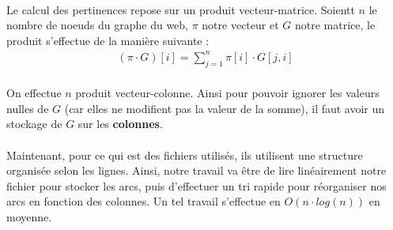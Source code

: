 		\paragraph{}Le calcul des pertinences repose sur un produit vecteur-matrice. Soientt $n$ le nombre de noeuds du graphe du web, $\pi$ notre vecteur et $G$ notre matrice, le produit s'effectue de la manière suivante :
			\begin{align*}
				(\pi \cdot G)[i] = \sum_{j = 1}^{n} \pi[i] \cdot G[j, i]
			\end{align*}
		\paragraph{}On effectue $n$ produit vecteur-colonne. Ainsi pour pouvoir ignorer les valeurs nulles de $G$ (car elles ne modifient pas la valeur de la somme), il faut avoir un stockage de $G$ sur les \textbf{colonnes}.
		\paragraph{}Maintenant, pour ce qui est des fichiers utilisés, ils utilisent une structure organisée selon les lignes. Ainsi, notre travail va être de lire linéairement notre fichier pour stocker les arcs, puis d'effectuer un tri rapide pour réorganiser nos arcs en fonction des colonnes. Un tel travail s'effectue en $O(n \cdot log(n))$ en moyenne.
